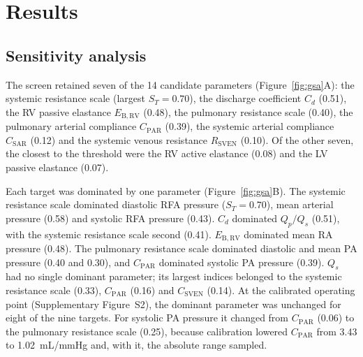 \FloatBarrier
\section{Results}
\label{sec:results}

\subsection{Sensitivity analysis}
\label{sec:results_gsa}
The screen retained seven of the 14 candidate parameters (Figure~\ref{fig:gsa}A): the systemic resistance scale (largest $S_T = 0.70$), the discharge coefficient $C_d$ (0.51), the RV passive elastance $E_{\mathrm{B,RV}}$ (0.48), the pulmonary resistance scale (0.40), the pulmonary arterial compliance $C_{\mathrm{PAR}}$ (0.39), the systemic arterial compliance $C_{\mathrm{SAR}}$ (0.12) and the systemic venous resistance $R_{\mathrm{SVEN}}$ (0.10). Of the other seven, the closest to the threshold were the RV active elastance (0.08) and the LV passive elastance (0.07).

Each target was dominated by one parameter (Figure~\ref{fig:gsa}B). The systemic resistance scale dominated diastolic RFA pressure ($S_T = 0.70$), mean arterial pressure (0.58) and systolic RFA pressure (0.43). $C_d$ dominated $Q_p/Q_s$ (0.51), with the systemic resistance scale second (0.41). $E_{\mathrm{B,RV}}$ dominated mean RA pressure (0.48). The pulmonary resistance scale dominated diastolic and mean PA pressure (0.40 and 0.30), and $C_{\mathrm{PAR}}$ dominated systolic PA pressure (0.39). $Q_s$ had no single dominant parameter; its largest indices belonged to the systemic resistance scale (0.33), $C_{\mathrm{PAR}}$ (0.16) and $C_{\mathrm{SVEN}}$ (0.14). At the calibrated operating point (Supplementary Figure~S2), the dominant parameter was unchanged for eight of the nine targets. For systolic PA pressure it changed from $C_{\mathrm{PAR}}$ (0.06) to the pulmonary resistance scale (0.25), because calibration lowered $C_{\mathrm{PAR}}$ from 3.43 to 1.02~mL/mmHg and, with it, the absolute range sampled.

